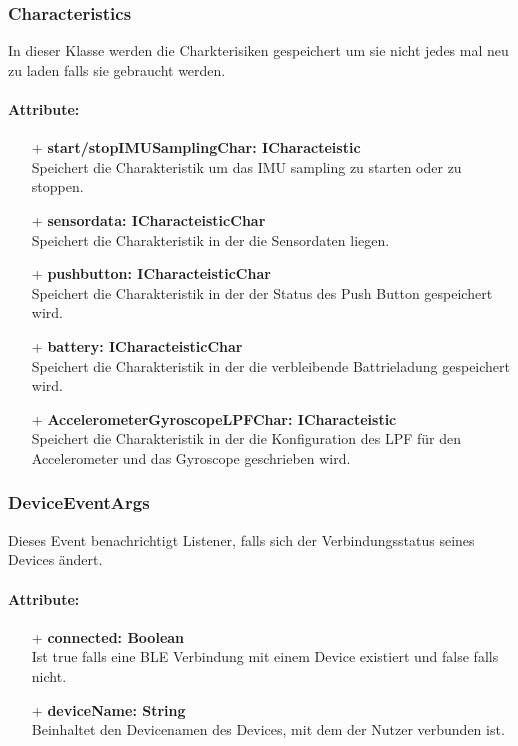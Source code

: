 \documentclass[a4paper,12pt]{article}
\begin{document}
\subsubsection{Characteristics}
In dieser Klasse werden die Charkterisiken gespeichert um sie nicht jedes mal neu zu laden falls sie gebraucht werden.

\paragraph{Attribute:}
\begin{itemize}
	\item[+] \textbf{start/stopIMUSamplingChar: ICharacteistic}\\Speichert die Charakteristik um das IMU sampling zu starten oder zu stoppen.
	\item[+] \textbf{sensordata: ICharacteisticChar}\\Speichert die Charakteristik in der die Sensordaten liegen.
	\item[+] \textbf{pushbutton: ICharacteisticChar}\\Speichert die Charakteristik in der der Status des Push Button gespeichert wird.
	\item[+] \textbf{battery: ICharacteisticChar}\\Speichert die Charakteristik in der die verbleibende Battrieladung gespeichert wird.
	\item[+] \textbf{AccelerometerGyroscopeLPFChar: ICharacteistic}\\Speichert die Charakteristik in der die Konfiguration des LPF für den Accelerometer und das Gyroscope geschrieben wird.
\end{itemize}


\subsubsection{DeviceEventArgs}
Dieses Event benachrichtigt Listener, falls sich der Verbindungsstatus seines Devices ändert.

\paragraph{Attribute:}
\begin{itemize}
	\item[+] \textbf{connected: Boolean}\\Ist true falls eine BLE Verbindung mit einem Device existiert und false falls nicht.
	\item[+] \textbf{deviceName: String}\\Beinhaltet den Devicenamen des Devices, mit dem der Nutzer verbunden ist.
\end{itemize}
\end{document}
